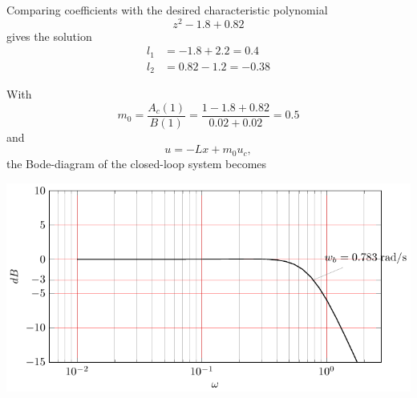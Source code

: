 \documentclass{scrartcl}
\begin{document}
Comparing coefficients with the desired characteristic polynomial 
\[ z^2 -1.8 + 0.82 \] gives the solution
\begin{align*}
l_1 &= -1.8 + 2.2 = 0.4\\
l_2 &= 0.82 - 1.2 = - 0.38
\end{align*}

With \[ m_0 = \frac{A_c(1)}{B(1)} = \frac{1-1.8+0.82}{0.02+ 0.02} = 0.5 \]
and 
\[ u = -Lx + m_0u_c, \]
the Bode-diagram of the closed-loop system becomes
\begin{center}
\includegraphics{bode-statefb-closed-sol}
\end{center}
\end{document}
